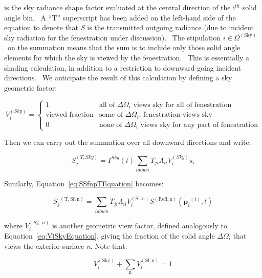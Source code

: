 is the sky radiance shape factor evaluated at the central direction of the i\(^{th}\) solid angle bin.~ A ``T'' superscript has been added on the left-hand side of the equation to denote that \emph{S} is the transmitted outgoing radiance (due to incident sky radiation for the fenestration under discussion).~ The stipulation \(i \in {\Omega ^{{\mathrm{(Sky)}}}}\) ~on the summation means that the sum is to include only those solid angle elements for which the sky is viewed by the fenestration.~ This is essentially a shading calculation, in addition to a restriction to downward-going incident directions.~ We anticipate the result of this calculation by defining a sky geometric factor:

\begin{equation}
V_i^{(Sky)} = \left\{
    \begin{array}{rl}
      1                      & \text{all of } \Delta\Omega_i \text{ views sky for all of fenestration} \\
      \text{viewed fraction} & \text{some of } \Delta\Omega_i \text{, fenestration views sky} \\
      0                      & \text{none of } \Delta\Omega_i \text{ views sky for any part of fenestration}
    \end{array}
  \right.
\label{eq:ViSkyEquation}
\end{equation}

Then we can carry out the summation over all downward directions and write:

\begin{equation}
  S_j^{(T,Sky)} = I^{Sky}(t)\sum_{i down} T_{ji} \Lambda_{ii} V_i^{(Sky)} {s_i}
\label{eq:SjTSkyEquation}
\end{equation}

Similarly, Equation~\ref{eq:SSfnpTEquation} becomes:

\begin{equation}
{S_j}^{{\mathrm{(T, Sf, n)}}} = \sum\limits_{i{\mathrm{ }}down} {{T_{ji}}{\Lambda_{ii}}V_i^{{\mathrm{(Sf, n)}}}{S^{{\mathrm{(Refl, n)}}}}({{\mathbf{p}}_i}^{{\mathrm{(I)}}},t)}
\label{eq:SjTSfnEquation}
\end{equation}

where \(V_{i}^{(Sf,\, n)}\) is another geometric view factor, defined analogously to Equation~\ref{eq:ViSkyEquation}, giving the fraction of the solid angle \(\Delta {\Omega_i}\) that views the exterior surface \emph{n}. Note that:

\begin{equation}
V_i^{{\mathrm{(Sky)}}} + \sum\limits_{\mathrm{n}} {V_i^{{\mathrm{(Sf, n)}}}}  = 1
\end{equation}

